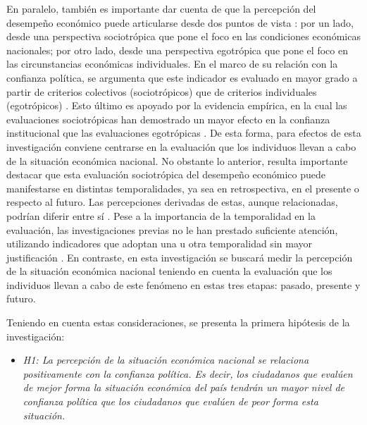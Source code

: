 \documentclass[12pt,twoside]{templates/facsothesis}
\providecommand{\tightlist}{%
  \setlength{\itemsep}{0pt}\setlength{\parskip}{0pt}}
\begin{document}
En paralelo, también es importante dar cuenta de que la percepción del desempeño económico puede articularse desde dos puntos de vista \citep{vandermeerEconomicPerformancePolitical2018}: por un lado, desde una perspectiva sociotrópica que pone el foco en las condiciones económicas nacionales; por otro lado, desde una perspectiva egotrópica que pone el foco en las circunstancias económicas individuales. En el marco de su relación con la confianza política, se argumenta que este indicador es evaluado en mayor grado a partir de criterios colectivos (sociotrópicos) que de criterios individuales (egotrópicos) \citep{mcallisterEconomicPerformanceGovernments1999}. Esto último es apoyado por la evidencia empírica, en la cual las evaluaciones sociotrópicas han demostrado un mayor efecto en la confianza institucional que las evaluaciones egotrópicas \citep{mainwaringStateDeficienciesParty2006, torcalDeclinePoliticalTrust2014a, torcalResponsivenessPerformanceCorruption2021, vandermeerEconomicPerformancePolitical2018}. De esta forma, para efectos de esta investigación conviene centrarse en la evaluación que los individuos llevan a cabo de la situación económica nacional. No obstante lo anterior, resulta importante destacar que esta evaluación sociotrópica del desempeño económico puede manifestarse en distintas temporalidades, ya sea en retrospectiva, en el presente o respecto al futuro. Las percepciones derivadas de estas, aunque relacionadas, podrían diferir entre sí \citep{torcalResponsivenessPerformanceCorruption2021}. Pese a la importancia de la temporalidad en la evaluación, las investigaciones previas no le han prestado suficiente atención, utilizando indicadores que adoptan una u otra temporalidad sin mayor justificación \citep{mainwaringStateDeficienciesParty2006, leeEconomicPerformanceIncome2020, oskarssonGeneralizedTrustPolitical2010}. En contraste, en esta investigación se buscará medir la percepción de la situación económica nacional teniendo en cuenta la evaluación que los individuos llevan a cabo de este fenómeno en estas tres etapas: pasado, presente y futuro.

Teniendo en cuenta estas consideraciones, se presenta la primera hipótesis de la investigación:

\begin{itemize}
\tightlist
\item
  \emph{H1: La percepción de la situación económica nacional se relaciona positivamente con la confianza política. Es decir, los ciudadanos que evalúen de mejor forma la situación económica del país tendrán un mayor nivel de confianza política que los ciudadanos que evalúen de peor forma esta situación.}
\end{itemize}
\end{document}
